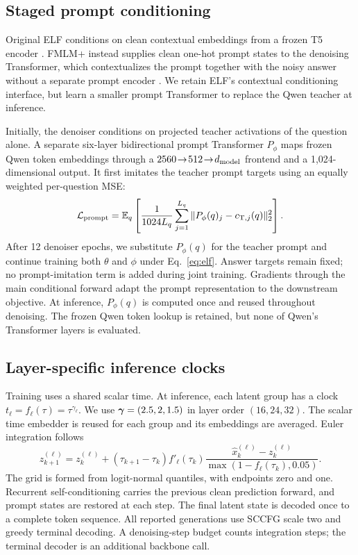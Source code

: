 \subsection{Staged prompt conditioning}
\label{sec:prompt}
Original ELF conditions on clean contextual embeddings from a frozen T5 encoder \citep{elf}. FMLM+ instead supplies clean one-hot prompt states to the denoising Transformer, which contextualizes the prompt together with the noisy answer without a separate prompt encoder \citep{posterior}. We retain ELF's contextual conditioning interface, but learn a smaller prompt Transformer to replace the Qwen teacher at inference.

Initially, the denoiser conditions on projected teacher activations of the question alone. A separate six-layer bidirectional prompt Transformer $P_\phi$ maps frozen Qwen token embeddings through a $2560\!\to\!512\!\to\!d_{\rm model}$ frontend and a 1,024-dimensional output. It first imitates the teacher prompt targets using an equally weighted per-question MSE:
\begin{equation}
 \mathcal L_{\rm prompt}=\mathbb{E}_q\left[
 \frac{1}{1024L_q}\sum_{j=1}^{L_q}
 \|P_\phi(q)_j-c_{{\rm T},j}(q)\|_2^2\right].
\end{equation}
After 12 denoiser epochs, we substitute $P_\phi(q)$ for the teacher prompt and continue training both $\theta$ and $\phi$ under Eq.~\eqref{eq:elf}. Answer targets remain fixed; no prompt-imitation term is added during joint training. Gradients through the main conditional forward adapt the prompt representation to the downstream objective.
At inference, $P_\phi(q)$ is computed once and reused throughout denoising. The frozen Qwen token lookup is retained, but none of Qwen's Transformer layers is evaluated.

\subsection{Layer-specific inference clocks}
\label{sec:clocks}
Training uses a shared scalar time. At inference, each latent group has a clock $t_\ell=f_\ell(\tau)=\tau^{\gamma_\ell}$. We use $\bm\gamma=(2.5,2,1.5)$ in layer order $(16,24,32)$. The scalar time embedder is reused for each group and its embeddings are averaged. Euler integration follows
\begin{equation}
 z^{(\ell)}_{k+1}=z^{(\ell)}_k+
 (\tau_{k+1}-\tau_k) f'_\ell(\tau_k)
 \frac{\widehat x^{(\ell)}_k-z^{(\ell)}_k}{\max(1-f_\ell(\tau_k),0.05)}.
 \label{eq:sampler}
\end{equation}
The grid is formed from logit-normal quantiles, with endpoints zero and one. Recurrent self-conditioning carries the previous clean prediction forward, and prompt states are restored at each step. The final latent state is decoded once to a complete token sequence. All reported generations use SCCFG scale two and greedy terminal decoding. A denoising-step budget counts integration steps; the terminal decoder is an additional backbone call.

